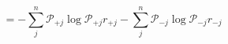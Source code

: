 \begin{equation}
\mathcal \ = -\sum_j^n\mathcal P_{+j}\log\mathcal P_{+j}r_{+j} -\sum_j^n\mathcal P_{-j}\log\mathcal P_{-j} r_{-j}
\end{equation}